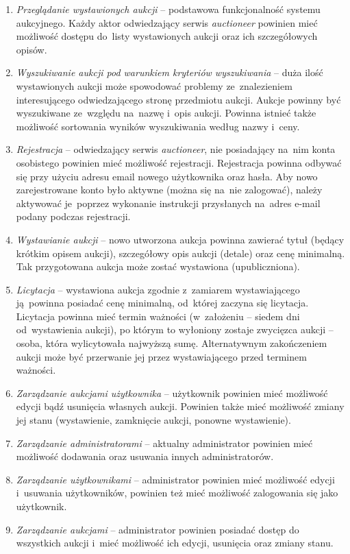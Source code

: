 \begin{enumerate}
  \item \textit{Przeglądanie wystawionych aukcji} -- podstawowa funkcjonalność systemu aukcyjnego. Każdy aktor odwiedzający serwis \textit{auctioneer} powinien mieć możliwość dostępu do~listy wystawionych aukcji oraz ich szczegółowych opisów.
  \item \textit{Wyszukiwanie aukcji pod warunkiem kryteriów wyszukiwania} -- duża ilość wystawionych aukcji może spowodować problemy ze~znalezieniem interesującego odwiedzającego stronę przedmiotu aukcji. Aukcje powinny być wyszukiwane ze~względu na~nazwę i~opis aukcji. Powinna istnieć także możliwość sortowania wyników wyszukiwania według nazwy i~ceny.
  \item \textit{Rejestracja} -- odwiedzający serwis \textit{auctioneer}, nie posiadający na~nim konta osobistego powinien mieć możliwość rejestracji. Rejestracja powinna odbywać się przy użyciu adresu email nowego użytkownika oraz hasła. Aby nowo zarejestrowane konto było aktywne (można się na~nie zalogować), należy aktywować je~poprzez wykonanie instrukcji przysłanych na~adres e-mail podany podczas rejestracji.
  \item \textit{Wystawianie aukcji} -- nowo utworzona aukcja powinna zawierać tytuł (będący krótkim opisem aukcji), szczegółowy opis aukcji (detale) oraz cenę minimalną. Tak przygotowana aukcja może zostać wystawiona (upubliczniona).
  \item \textit{Licytacja} -- wystawiona aukcja zgodnie z~zamiarem wystawiającego ją~powinna posiadać cenę minimalną, od~której zaczyna się licytacja. Licytacja powinna mieć termin ważności (w~założeniu -- siedem dni od~wystawienia aukcji), po którym to wyłoniony zostaje zwycięzca aukcji -- osoba, która wylicytowała najwyższą sumę. Alternatywnym zakończeniem aukcji może być przerwanie jej przez wystawiającego przed terminem ważności.
  \item \textit{Zarządzanie aukcjami użytkownika} -- użytkownik powinien mieć możliwość edycji bądź usunięcia własnych aukcji. Powinien także mieć możliwość zmiany jej stanu (wystawienie, zamknięcie aukcji, ponowne wystawienie).
  \item \textit{Zarządzanie administratorami} -- aktualny administrator powinien mieć możliwość dodawania oraz usuwania innych administratorów.
  \item \textit{Zarządzanie użytkownikami} -- administrator powinien mieć możliwość edycji i~usuwania użytkowników, powinien też mieć możliwość zalogowania się jako użytkownik.
  \item \textit{Zarządzanie aukcjami} -- administrator powinien posiadać dostęp do wszystkich aukcji i~mieć możliwość ich edycji, usunięcia oraz zmiany stanu.
\end{enumerate}

